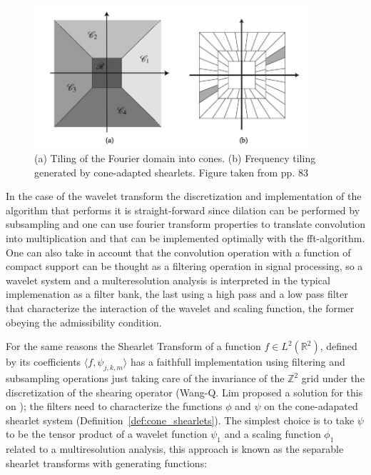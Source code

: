 \begin{figure}[!tbp]
  \centering
   \includegraphics[width=0.9\textwidth]{./Diagrams/tiling_cone.jpg}
    \caption{(a) Tiling of the Fourier domain into cones. (b) Frequency tiling generated by cone-adapted shearlets. Figure taken from \cite{Gitta-notes} pp. 83 }
  \label{fig:tiling_cone}
\end{figure}

\bigskip

In the case of the wavelet transform the discretization and implementation of the algorithm that performs it is straight-forward since dilation can be performed by subsampling and one can use fourier transform properties to translate convolution into multiplication and that can be implemented optimally with the fft-algorithm. One can also take in account that the convolution operation with a function of compact support can be thought as a filtering operation in signal processing, so a wavelet system and a multeresolution analysis  is interpreted in the typical implemenation as a filter bank, the last using a high pass and a low pass filter that characterize the interaction of the wavelet and scaling function, the former obeying the admissibility condition. 

\bigskip

For the same reasons the Shearlet Transform of a function $f\in L^2(\mathbb{R}^2)$, defined by its coefficients $\langle f,\psi_{j,k,m}\rangle$ has a faithfull implementation using filtering and subsampling operations just taking care of the invariance of the $\mathbb{Z}^2$ grid under the discretization of the shearing operator (Wang-Q. Lim proposed a solution for this on \cite{Nonseparableshear}); the filters need to characterize the functions $\phi$ and $\psi$ on the cone-adapated shearlet system (Definition~\ref{def:cone_shearlets}). The simplest choice is to take $\psi$ to be the tensor product of a wavelet function $\psi_1$ and a scaling function $\phi_1$ related to a multiresolution analysis, this approach is known as the separable shearlet transforms with generating functions:

